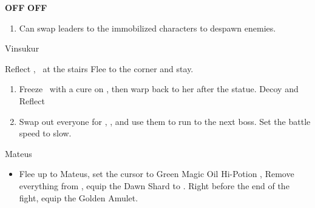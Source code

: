 \begin{gambit}
\begin{itemize}
\vaanf \textbf{OFF}
\penelof \textbf{OFF}
\end{itemize}		
\end{gambit}
\begin{enumerate}
\item Can swap leaders to the immobilized characters to despawn enemies.
\end{enumerate}
\begin{battle}{Vinsukur}
\begin{itemize}
\vaanf Reflect \ashe, \penelo\ at the stairs
\vaanf Flee to the corner and stay.
\end{itemize}
\end{battle}
\begin{enumerate}
\item Freeze \penelo\ with a cure on \vaan, then warp back to her after the statue.
\vaan Decoy and Reflect \vaan
\item Swap out everyone for \balthier, \basch, and use them to run to the next boss. Set the battle speed to slow.
\end{enumerate}
\begin{battle}{Mateus}
\begin{itemize}
\item Flee up to Mateus, set the cursor to Green Magic
\penelof Oil \penelo
\vaanf Hi-Potion \vaan, Remove everything from \basch, equip the Dawn Shard to \vaan. Right before the end of the fight, equip the Golden Amulet.
\end{itemize}
\end{battle}